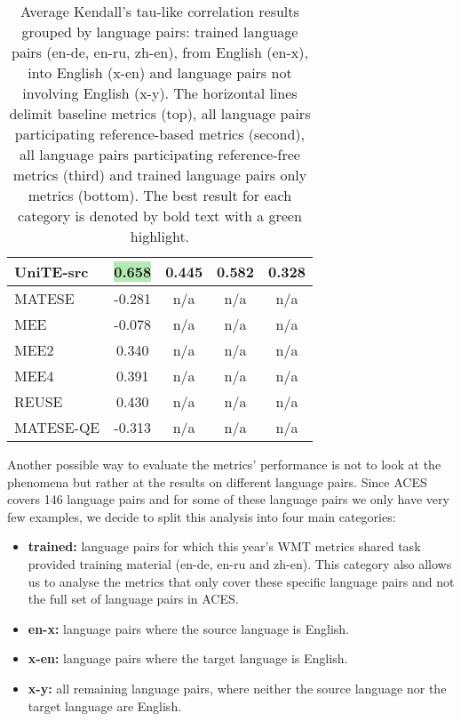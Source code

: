 \documentclass[11pt]{article}
\begin{document}
\begin{table}[ht]
\begin{tabular}{@{}lcccc@{}}
UniTE-src               & \colorbox[HTML]{B2EAB1}{\textbf{\phantom{-}0.658}}  & \phantom{-}0.445                   & \phantom{-}0.582                   & \phantom{-}0.328                   \\ \midrule
MATESE                  & -0.281 & \phantom{-}n/a                   & n/a & n/a \\
MEE                     & -0.078 & n/a & n/a & n/a \\
MEE2                    & \phantom{-}0.340  & n/a & n/a & n/a \\
MEE4                    & \phantom{-}0.391  & n/a & n/a & n/a \\
REUSE     & \phantom{-}0.430  & n/a & n/a & n/a \\
MATESE-QE & -0.313 & n/a & n/a & n/a \\ 

\bottomrule
\end{tabular}
\caption{Average Kendall’s tau-like correlation results grouped by language pairs: trained language pairs (en-de, en-ru, zh-en), from English (en-x), into English (x-en) and language pairs not involving English (x-y).  The horizontal lines delimit baseline metrics (top), all language pairs participating reference-based metrics (second), all language pairs participating reference-free metrics (third) and trained language pairs only metrics (bottom). The best result for each category is denoted by bold text with a green highlight.}
\label{tab:analysis_langpairs}
\end{table} 
Another possible way to evaluate the metrics' performance is not to look at the phenomena but rather at the results on different language pairs. Since \textsc{ACES} covers 146 language pairs and for some of these language pairs we only have very few examples, we decide to split this analysis into four main categories: 

\begin{itemize}
    \item \textbf{trained:} language pairs for which this year's WMT metrics shared task provided training material (en-de, en-ru and zh-en). This category also allows us to analyse the metrics that only cover these specific language pairs and not the full set of language pairs in \textsc{ACES}.
    \item \textbf{en-x:} language pairs where the source language is English.
    \item \textbf{x-en:} language pairs where the target language is English.
    \item \textbf{x-y:} all remaining language pairs, where neither the source language nor the target language are English.
\end{itemize}
\end{document}
